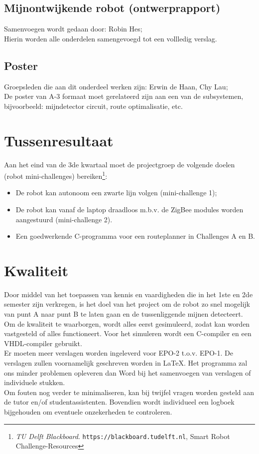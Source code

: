 \documentclass[11pt]{article}
\begin{document}
\subsection{Mijnontwijkende robot (ontwerprapport)}
Samenvoegen wordt gedaan door: Robin Hes;
\\Hierin worden alle onderdelen samengevoegd tot een vollledig verslag. 

\subsection{Poster}
Groepsleden die aan dit onderdeel werken zijn: Erwin de Haan, Chy Lau;
\\De poster van A-3 formaat moet gerelateerd zijn aan een van de subsystemen, bijvoorbeeld: mijndetector circuit, route optimalisatie, etc. 

\newpage
\section{Tussenresultaat}
Aan het eind van de 3de kwartaal moet de projectgroep de volgende doelen (robot mini-challenges) bereiken\footnote{\textit{TU Delft Blackboard}. \texttt{https://blackboard.tudelft.nl}, Smart Robot Challenge-Resources}:

\begin{itemize}
\item De robot kan autonoom een zwarte lijn volgen (mini-challenge 1);
\item De robot kan vanaf de laptop draadloos m.b.v. de ZigBee modules worden aangestuurd (mini-challenge 2).
\item Een goedwerkende C-programma voor een routeplanner in Challenges A en B.
\end{itemize}

\section{Kwaliteit}
Door middel van het toepassen van kennis en vaardigheden die in het 1ste en 2de semester zijn verkregen, is het doel van het project om de robot zo snel mogelijk van punt A naar punt B te laten gaan en de tussenliggende mijnen detecteert. Om de kwaliteit te waarborgen, wordt alles eerst gesimuleerd, zodat kan worden vastgesteld of alles functioneert. Voor het simuleren wordt een C-compiler en een VHDL-compiler gebruikt.\\
\indent Er moeten meer verslagen worden ingeleverd voor EPO-2 t.o.v. EPO-1. De verslagen zullen voornamelijk geschreven worden in \LaTeX. Het programma zal ons minder problemen opleveren dan Word bij het samenvoegen van verslagen of individuele stukken.\\
\indent Om fouten nog verder te minimaliseren, kan bij twijfel vragen worden gesteld aan de tutor en/of studentassistenten. Bovendien wordt individueel een logboek bijgehouden om eventuele onzekerheden te controleren. 
\end{document}
